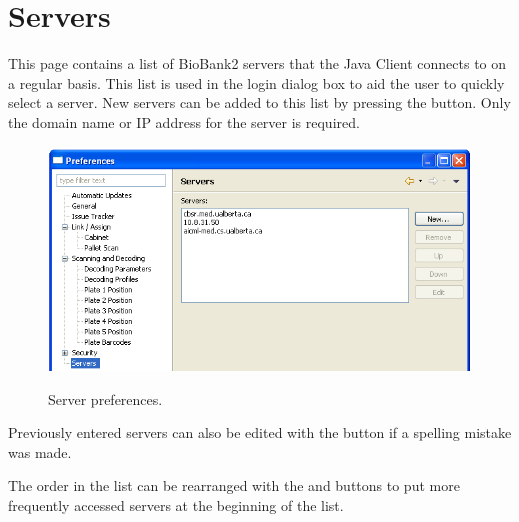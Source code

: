 \section{Servers}
This page contains a list of BioBank2 servers that the Java Client connects to
on a regular basis. This list is used in the login dialog box to aid the user
to quickly select a server. New servers can be added to this list by pressing
the  button. Only the domain name or IP address for the server is
required.
    \begin{figure}[H]
      \centering
      \scalebox{0.45}
      { \includegraphics*{screenshots/configuration/prefs_servers} }
      \caption{Server preferences.}
      \label{fig:prefs_servers}
    \end{figure}

Previously entered servers can also be edited with the  button if a
spelling mistake was made.

The order in the list can be rearranged with the  and 
buttons to put more frequently accessed servers at the beginning of the list.



